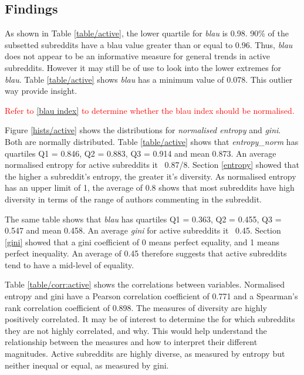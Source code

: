 \documentclass{article}
\begin{document}
\subsection{Findings}

As shown in Table \ref{table/active}, the lower quartile for \textit{blau} is 0.98. 90\% of the subsetted subreddits have a blau value greater than or equal to 0.96.  Thus, \textit{blau} does not appear to be an informative measure for general trends in active subreddits. However it may still be of use to look into the lower extremes for \textit{blau}. Table \ref{table/active} shows \textit{blau} has a minimum value of 0.078. This outlier way provide insight.

\textcolor{red}{Refer to \ref{blau index} to determine whether the blau index should be normalised.}

Figure \ref{hists/active} shows the distributions for \textit{normalised entropy} and \textit{gini}. Both are normally distributed. Table \ref{table/active} shows that \textit{entropy\_norm} has quartiles Q1 = 0.846, Q2 = 0.883, Q3 = 0.914 and mean 0.873. An average normalised entropy for active subreddits it ~0.87/8. Section \ref{entropy} showed that the higher a subreddit's entropy, the greater it's diversity. As normalised entropy has an upper limit of 1, the average of 0.8 shows that most subreddits have high diversity in terms of the range of authors commenting in the subreddit.

The same table shows that \textit{blau} has quartiles Q1 = 0.363, Q2 = 0.455, Q3 = 0.547 and mean 0.458. An average \textit{gini} for active subreddits it ~0.45. Section \ref{gini} showed that a gini coefficient of 0 means perfect equality, and 1 means perfect inequality. An average of 0.45 therefore suggests that active subreddits tend to have a mid-level of equality.

Table \ref{table/corr:active} shows the correlations between variables. Normalised entropy and gini have a Pearson correlation coefficient of 0.771 and a Spearman's rank correlation coefficient of 0.898. The measures of diversity are highly positively correlated. It may be of interest to determine the for which subreddits they are not highly correlated, and why. This would help understand the relationship between the measures and how to interpret their different magnitudes. Active subreddits are highly diverse, as measured by entropy but neither inequal or equal, as measured by gini.






\end{document}
